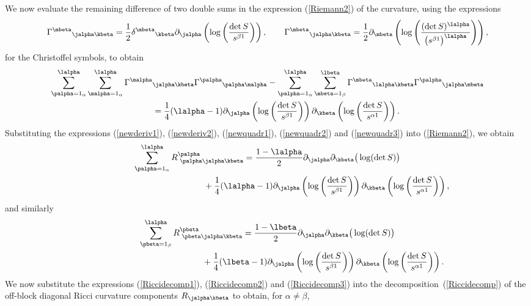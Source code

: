 We now evaluate the remaining difference of two double sums in the expression (\ref{Riemann2}) of the curvature, using the expressions
\[
{\Gamma^{\mbeta}}_{\jalpha \kbeta}=\frac{1}{2}{\delta^{\mbeta}}_{\kbeta}\partial_{\jalpha}\left(\log\left(\frac{\det S}{s^{\beta 1}}  \right)\right), \qquad {\Gamma^{\mbeta}}_{\jalpha \kbeta} = \frac{1}{2}\partial_{\mbeta}\left(\log\left(\frac{(\det S)^{\lalpha}}{\big(s^{\beta 1}\big)^{\lalpha}} \right)\right),
\]
for the Christoffel symbols, to obtain
\begin{gather}
\sum_{\palpha=1_{\alpha}}^{\lalpha}\sum_{\malpha = 1_{\alpha}}^{\lalpha}{\Gamma^{\malpha}}_{\jalpha \kbeta}{\Gamma^{\palpha}}_{\palpha \malpha}-\sum_{\palpha=1_{\alpha}}^{\lalpha}\sum_{\mbeta=1_{\beta}}^{\lbeta}{\Gamma^{\mbeta}}_{\lalpha \kbeta}{\Gamma^{\palpha}}_{\jalpha \mbeta}\nonumber\\
\qquad{} =\frac{1}{4}(\lalpha-1)\partial_{\jalpha}\left(\log \left(\frac{\det S}{s^{\beta 1}}\right)\right)\partial_{\kbeta}\left(\log\left(\frac{\det S}{s^{\alpha 1}} \right)\right).\label{newquadr3}
\end{gather}
Substituting the expressions (\ref{newderiv1}), (\ref{newderiv2}), (\ref{newquadr1}), (\ref{newquadr2}) and (\ref{newquadr3}) into (\ref{Riemann2}), we obtain
\begin{gather}
\sum_{\palpha=1_{\alpha}}^{\lalpha}R^{\palpha}_{{\phantom l} \palpha \jalpha \kbeta}= \frac{1-\lalpha}{2} \partial_{\jalpha}\partial_{\kbeta} \big(\log(\det S)\big)\nonumber\\
\hphantom{\sum_{\palpha=1_{\alpha}}^{\lalpha}R^{\palpha}_{{\phantom l} \palpha \jalpha \kbeta}=}{}
+\frac{1}{4}(\lalpha-1)\partial_{\jalpha}\left(\log\left(\frac{\det S}{s^{\beta 1}}\right)\right)\partial_{\kbeta}\left(\log\left(\frac{\det S}{s^{\alpha 1}}\right)\right),\label{Riccidecomp2}
\end{gather}
and similarly
\begin{gather}\label{Riccidecomp3}
\sum_{\pbeta=1_{\beta}}^{\lalpha}R^{\pbeta}_{{\phantom l} \pbeta \jalpha \kbeta}=\frac{1-\lbeta}{2}\partial_{\jalpha}\partial_{\kbeta} \big(\log(\det S)\big)\nonumber\\
\hphantom{\sum_{\pbeta=1_{\beta}}^{\lalpha}R^{\pbeta}_{{\phantom l} \pbeta \jalpha \kbeta}=}{}
+\frac{1}{4}(\lbeta-1)\partial_{\jalpha}\left(\log\left(\frac{\det S}{s^{\beta 1}}\right)\right)\partial_{\kbeta}\left(\log\left(\frac{\det S}{s^{\alpha 1}}\right)\right).
\end{gather}
We now substitute the expressions (\ref{Riccidecomp1}), (\ref{Riccidecomp2}) and (\ref{Riccidecomp3}) into the decomposition~(\ref{Riccidecomp}) of the off-block diagonal Ricci curvature components $R_{\jalpha \kbeta}$ to obtain, for $\alpha \neq \beta$,
